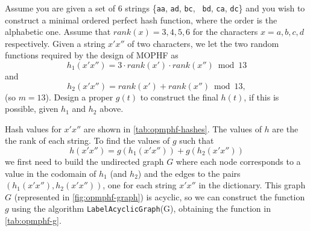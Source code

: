 \exercise

Assume you are given a set of 6 strings \{{\tt aa}, {\tt ad}, {\tt bc}, {\tt
bd}, {\tt ca}, {\tt dc}\} and you wish to construct a minimal ordered perfect
hash function, where the order is the alphabetic one.  Assume that
$rank(x)=3,4,5,6$ for the characters $x=a,b,c,d$ respectively. Given a string
$x'x''$ of two characters, we let the two random functions required by the
design of MOPHF as $$h_1(x'x'') = 3 \cdot rank(x') \cdot rank(x'') \bmod 13$$
and $$h_2(x'x'') = rank(x') + rank(x'') \bmod 13,$$ (so $m = 13$). Design a
proper $g(t)$ to construct the final $h(t)$, if this is possible, given $h_1$
and $h_2$ above.

\solution

Hash values for $x'x''$ are shown in \autoref{tab:opmphf-hashes}. The values of
$h$ are the the rank of each string. To find the values of $g$ such that
$$h(x'x'') = g(h_1(x'x'')) + g(h_2(x'x''))$$ we first need to build the
undirected graph $G$ where each node corresponds to a value in the codomain of
$h_1$ (and $h_2$) and the edges to the pairs $(h_1(x'x''), h_2(x'x''))$, one for
each string $x'x''$ in the dictionary. This graph $G$ (represented in
\autoref{fig:opmphf-graph}) is acyclic, so we can construct the function $g$
using the algorithm {\tt LabelAcyclicGraph}(G), obtaining the function in
\autoref{tab:opmphf-g}.
%
